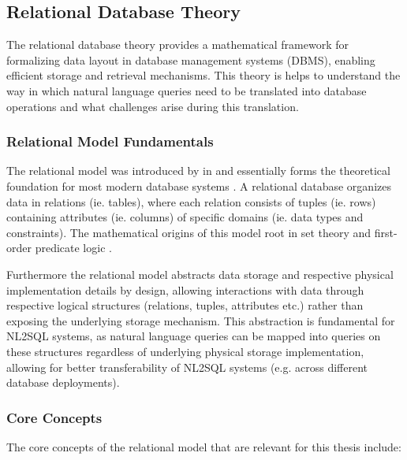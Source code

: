 \subsection{Relational Database Theory}

The relational database theory provides a mathematical framework for formalizing data layout in database management
systems (DBMS), enabling efficient storage and retrieval mechanisms. This theory is helps to understand the way in
which natural language queries need to be translated into database operations and what challenges arise during this
translation.

\subsubsection{Relational Model Fundamentals}

The relational model was introduced by \citeauthor{RelationalModel} in \citeyear{RelationalModel} and essentially forms
the theoretical foundation for most modern database systems \citep{RelationalModel, Rendezvous}. A relational database
organizes data in relations (ie. tables), where each relation consists of tuples (ie. rows) containing attributes
(ie. columns) of specific domains (ie. data types and constraints). The mathematical origins of this model root in
set theory and first-order predicate logic \citep{RelationalModel, DatabaseSystemIntro}.

Furthermore the relational model abstracts data storage and respective physical implementation details by design,
allowing interactions with data through respective logical structures (relations, tuples, attributes etc.) rather than
exposing the underlying storage mechanism. This abstraction is fundamental for NL2SQL systems, as natural language
queries can be mapped into queries on these structures regardless of underlying physical storage implementation,
allowing for better transferability of NL2SQL systems (e.g. across different database deployments).

\subsubsection{Core Concepts}

The core concepts of the relational model that are relevant for this thesis include:

